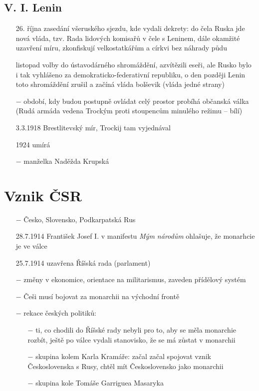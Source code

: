 \documentclass{article}
\begin{document}
\subsection*{V. I. Lenin}
\begin{itemize}
    \vspace{-0.5em}
    \setlength\itemsep{0.15em}
    \item[26. října] zasedání všeruského sjezdu, kde vydali dekrety: do čela Ruska jde nová vláda, tzv. Rada lidových komisařů v čele s Leninem, dále okamžité uzavření míru, zkonfiskují velkostatkářům a církvi bez náhrady půdu
    \item[listopad] volby do ústavodárného shromáždění, azvítězili eseři, ale Rusko bylo i tak vyhlášeno za demokraticko-federativní republiku, o den později Lenin toto shromáždění zrušil a začíná vláda bolševik (vláda jedné strany)
    \item[$-$] období, kdy budou postupně ovládat celý prostor probíhá občanská válka (Rudá armáda vedena Trockým proti stoupencům minulého režimu -- bílí)
    \item[3.3.1918] Brestlitevský mír, Trockij tam vyjednával
    \item[1924] umírá
    \item[$-$] manželka Naděžda Krupská
\end{itemize}

\section*{Vznik ČSR}
\begin{itemize}
    \vspace{-0.5em}
    \setlength\itemsep{0.15em}
    \item[$-$] Česko, Slovensko, Podkarpatská Rus
    \item[28.7.1914] František Josef I. v manifestu \textit{Mým národům} ohlašuje, že monarhcie je ve válce
    \item[25.7.1914]uzavřena Říšská rada (parlament)
    \item[$-$] změny v ekonomice, orientace na militarismus, zaveden přídělový systém
    \item[$-$] Češi musí bojovat za monarchii na východní frontě
    \item[$-$] rekace českých politiků:
    \begin{itemize}
        \vspace{-0.5em}
        \setlength\itemsep{0.15em}
        \item[$-$] ti, co chodili do Říšské rady nebyli pro to, aby se měla monarchie rozbít, ještě po válce vydali stanovisko, že se má zůstat v monarchii
        \item[$-$] skupina kolem Karla Kramáře: začal začal spojovat vznik Československa s Rusy, chtěl mít Československo jako monarchii
        \item[$-$] skupina kole Tomáše Garriguea Masaryka
    \end{itemize}
\end{itemize}
\end{document}
